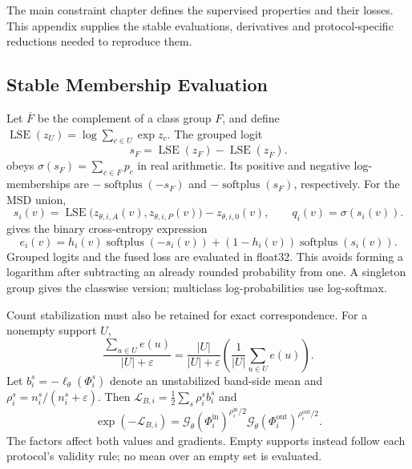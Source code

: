 \documentclass[12pt,a4paper]{article}
\begin{document}
The main constraint chapter defines the supervised properties and their
losses. This appendix supplies the stable evaluations, derivatives and
protocol-specific reductions needed to reproduce them.

\subsection{Stable Membership Evaluation}

Let $\overline F$ be the complement of a class group $F$, and define
$\operatorname{LSE}(z_U)=\log\sum_{c\in U}\exp z_c$. The grouped logit
\begin{equation}
s_F=\operatorname{LSE}(z_F)-\operatorname{LSE}(z_{\overline{F}}).
\label{eq:grouped-predicate-logit}
\end{equation}
obeys $\sigma(s_F)=\sum_{c\in F}p_c$ in real arithmetic. Its positive
and negative log-memberships are
$-\operatorname{softplus}(-s_F)$ and
$-\operatorname{softplus}(s_F)$, respectively. For the MSD union,
\begin{equation}
s_i(v)=\operatorname{LSE}\bigl(z_{\theta,i,A}(v),
                              z_{\theta,i,P}(v)\bigr)
        -z_{\theta,i,0}(v),
\qquad q_i(v)=\sigma(s_i(v)).
\label{eq:msd-band-logit}
\end{equation}
gives the binary cross-entropy expression
\begin{equation}
e_i(v)=h_i(v)\operatorname{softplus}(-s_i(v))
       +(1-h_i(v))\operatorname{softplus}(s_i(v)).
\label{eq:band-stable-bce}
\end{equation}
Grouped logits and the fused loss are evaluated in float32. This avoids
forming a logarithm after subtracting an already rounded probability
from one. A singleton group gives the classwise version; multiclass
log-probabilities use log-softmax.

Count stabilization must also be retained for exact correspondence.
For a nonempty support $U$,
\begin{equation}
\frac{\sum_{u\in U}e(u)}{|U|+\varepsilon}
=\frac{|U|}{|U|+\varepsilon}
\left(\frac{1}{|U|}\sum_{u\in U}e(u)\right).
\label{eq:stabilized-quantifier-reduction}
\end{equation}
Let $b_i^s=-\ell_\theta(\Phi_i^s)$ denote an unstabilized band-side
mean and $\rho_i^s=n_i^s/(n_i^s+\varepsilon)$. Then
$\mathcal L_{B,i}=\tfrac12\sum_s\rho_i^s b_i^s$ and
\begin{equation}
\exp(-\mathcal{L}_{B,i})
=\mathcal{G}_\theta(\Phi_i^{\mathrm{in}})^{\rho_i^{\mathrm{in}}/2}
 \mathcal{G}_\theta(\Phi_i^{\mathrm{out}})^{\rho_i^{\mathrm{out}}/2}.
\label{eq:balanced-band-satisfaction}
\end{equation}
The factors affect both values and gradients. Empty supports instead
follow each protocol's validity rule; no mean over an empty set is
evaluated.
\end{document}
